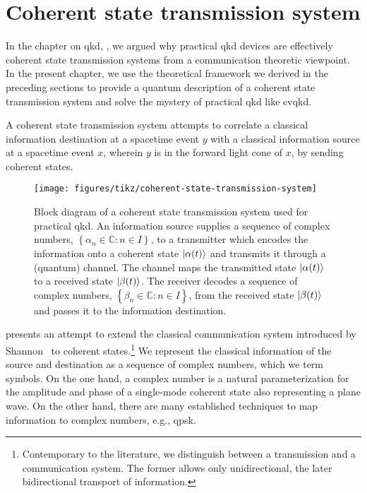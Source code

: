 \chapter{Coherent state transmission system}\label{ch:system}

In the chapter on \gls{qkd}, , we argued why practical \gls{qkd} devices are effectively coherent state transmission systems from a communication theoretic viewpoint.
In the present chapter, we use the theoretical framework we derived in the preceding sections to provide a quantum description of a coherent state transmission system and solve the mystery of practical \gls{qkd} like \gls{cvqkd}.

A coherent state transmission system attempts to correlate a classical information destination at a spacetime event $y$ with a classical information source at a spacetime event $x$, wherein $y$ is in the forward light cone of $x$, by sending coherent states.
\begin{figure}[htb]
	\centering
	\texttt{[image: figures/tikz/coherent-state-transmission-system]}
	\caption{Block diagram of a coherent state transmission system used for practical \gls{qkd}. An information source supplies a sequence of complex numbers, $\left\{\alpha_n\in\mathbb{C}\colon n\in I\right\}$, to a transmitter which encodes the information onto a coherent state $\lvert\alpha(t)\rangle$ and transmits it through a (quantum) channel. The channel maps the transmitted state $\lvert\alpha(t)\rangle$ to a received state $\lvert\beta(t)\rangle$. The receiver decodes a sequence of complex numbers, $\left\{\beta_n\in\mathbb{C}\colon n\in I\right\}$, from the received state $\lvert\beta(t)\rangle$ and passes it to the information destination.}\label{fig:coherent_state_transmission_system}
\end{figure}
 presents an attempt to extend the classical communication system introduced by Shannon~\cite{Shannon1948} to coherent states.\footnote{Contemporary to the literature, we distinguish between a transmission and a communication system. The former allows only unidirectional, the later bidirectional transport of information.}
We represent the classical information of the source and destination as a sequence of complex numbers, which we term symbols.
On the one hand, a complex number is a natural parameterization for the amplitude and phase of a single-mode coherent state also representing a plane wave.
On the other hand, there are many established techniques to map information to complex numbers, e.g., \gls{qpsk}.
